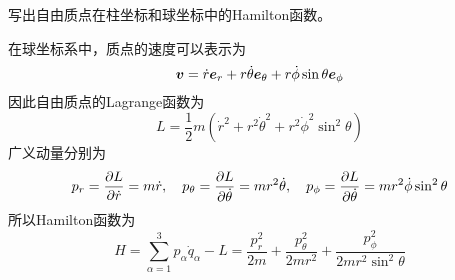 \begin{question}[272页8.1]
写出自由质点在柱坐标和球坐标中的Hamilton函数。
\end{question}
\begin{solution}
在球坐标系中，质点的速度可以表示为
\begin{equation*}
	\boldsymbol{v} = \dot{r} \boldsymbol{e}_r + r\dot{\theta} \boldsymbol{e}_\theta + r \dot{\phi} \sin \theta \boldsymbol{e}_\phi
\end{equation*}
因此自由质点的Lagrange函数为
\begin{equation*}
	L = \frac12 m(\dot{r}^2 + r^2 \dot{\theta}^2 + r^2 \dot{\phi}^2 \sin^2 \theta)
\end{equation*}
广义动量分别为
\begin{equation*}
	p_r = \frac{\partial L}{\partial \dot{r}} = m\dot{r},\quad p_\theta = \frac{\partial L}{\partial \dot{\theta}} = mr^2 \dot{\theta},\quad p_\phi = \frac{\partial L}{\partial \dot{\theta}} = mr^2 \dot{\phi} \sin^2 \theta
\end{equation*}
所以Hamilton函数为
\begin{equation*}
	H = \sum_{\alpha=1}^3 p_\alpha \dot{q}_\alpha - L = \frac{p_r^2}{2m} + \frac{p_\theta^2}{2mr^2} + \frac{p_\phi^2}{2mr^2\sin^2 \theta}
\end{equation*}
\end{solution}

